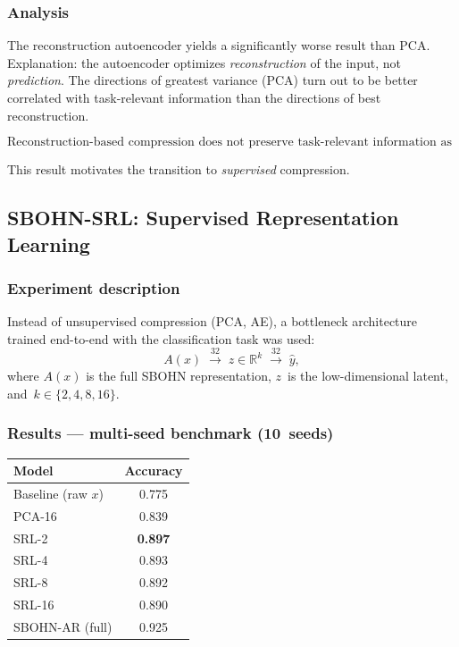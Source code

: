 \documentclass[11pt,a4paper]{report}
\begin{document}
\subsubsection{Analysis}

The reconstruction autoencoder yields a significantly worse result than PCA. Explanation: the autoencoder optimizes \emph{reconstruction} of the input, not \emph{prediction}. The directions of greatest variance (PCA) turn out to be better correlated with task-relevant information than the directions of best reconstruction.

\[
\boxed{\text{Reconstruction-based compression does not preserve task-relevant information as well as PCA.}}
\]

This result motivates the transition to \emph{supervised} compression.

\subsection{SBOHN-SRL: Supervised Representation Learning}

\subsubsection{Experiment description}

Instead of unsupervised compression (PCA, AE), a bottleneck architecture trained end-to-end with the classification task was used:
\[
A(x) \;\xrightarrow{\text{32}}\; z \in \mathbb{R}^k \;\xrightarrow{\text{32}}\; \hat{y},
\]
where $A(x)$ is the full SBOHN representation, $z$~is the low-dimensional latent, and~$k\in\{2,4,8,16\}$.

\subsubsection{Results --- multi-seed benchmark (10~seeds)}

\begin{center}
\begin{tabular}{lc}
\toprule
Model & Accuracy \\
\midrule
Baseline (raw $x$) & 0.775 \\
PCA-16 & 0.839 \\
SRL-2 & \textbf{0.897} \\
SRL-4 & 0.893 \\
SRL-8 & 0.892 \\
SRL-16 & 0.890 \\
SBOHN-AR (full) & 0.925 \\
\bottomrule
\end{tabular}
\end{center}
\end{document}
